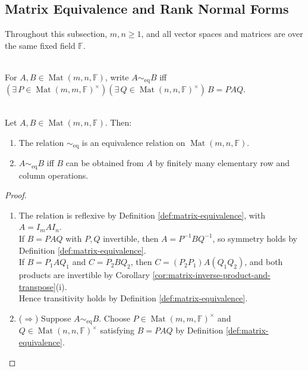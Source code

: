 \subsection{Matrix Equivalence and Rank Normal Forms}
Throughout this subsection, $m,n\geq1$, and all vector spaces and matrices are over the same fixed field $\mathbb{F}$.

\begin{definition} \label{def:matrix-equivalence} \\
For $A,B\in\operatorname{Mat}(m,n,\mathbb{F})$, write $A\sim_{\mathrm{eq}}B$ iff $(\exists\,P\in\operatorname{Mat}(m,m,\mathbb{F})^{\times})(\exists\,Q\in\operatorname{Mat}(n,n,\mathbb{F})^{\times})\,B=PAQ$.
\end{definition}

\begin{proposition} \label{prop:matrix-equivalence-basic-properties} \\
Let $A,B\in\operatorname{Mat}(m,n,\mathbb{F})$. Then:
\begin{enumerate}[label=(\roman*)]
\setlength{\itemsep}{0pt}
\item The relation $\sim_{\mathrm{eq}}$ is an equivalence relation on $\operatorname{Mat}(m,n,\mathbb{F})$.
\item $A\sim_{\mathrm{eq}}B$ iff $B$ can be obtained from $A$ by finitely many elementary row and column operations.
\end{enumerate}
\begin{proof}
\begin{enumerate}[label=(\roman*)]
\setlength{\itemsep}{0pt}
\item[$(i)$] The relation is reflexive by Definition \ref{def:matrix-equivalence}, with $A=I_mAI_n$.\\
If $B=PAQ$ with $P,Q$ invertible, then $A=P^{-1}BQ^{-1}$, so symmetry holds by Definition \ref{def:matrix-equivalence}.\\
If $B=P_1AQ_1$ and $C=P_2BQ_2$, then $C=(P_2P_1)A(Q_1Q_2)$, and both products are invertible by Corollary \ref{cor:matrix-inverse-product-and-transpose}(i).\\
Hence transitivity holds by Definition \ref{def:matrix-equivalence}.
\item[$(ii)$] ($\Rightarrow$) Suppose $A\sim_{\mathrm{eq}}B$. Choose $P\in\operatorname{Mat}(m,m,\mathbb{F})^{\times}$ and $Q\in\operatorname{Mat}(n,n,\mathbb{F})^{\times}$ satisfying $B=PAQ$ by Definition \ref{def:matrix-equivalence}.\\

\end{enumerate}
\end{proof}
\end{proposition}
